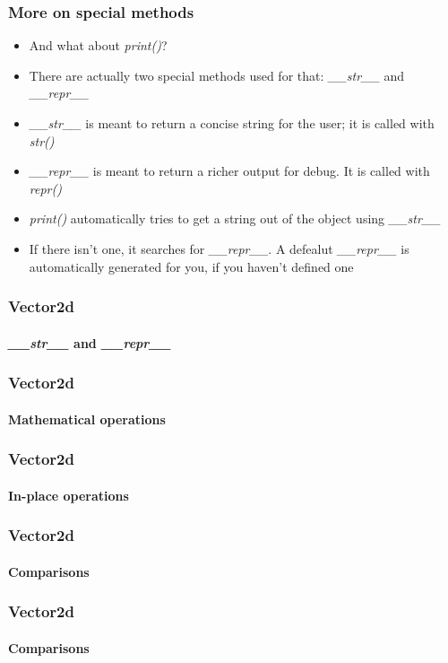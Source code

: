 \documentclass[9pt]{beamer}
\begin{document}
\begin{frame}
  \frametitle{More on special methods}
  
  \begin{itemize}
    \item And what about \emph{print()}?
    \item There are actually two special methods used for that: \emph{\_\_str\_\_} and \emph{\_\_repr\_\_}
    \medskip
    \item \emph{\_\_str\_\_} is meant to return a concise string for the user; it is called with \emph{str()}
    \medskip
    \item \emph{\_\_repr\_\_} is meant to return a richer output for debug. It is called with \emph{repr()}
    \medskip
    \item \emph{print()} automatically tries to get a string out of the object using \emph{\_\_str\_\_}
    \medskip
    \item If there isn't one, it searches for \emph{\_\_repr\_\_}. A defealut \emph{\_\_repr\_\_}
          is automatically generated for you, if you haven't defined one
  \end{itemize}
  
\end{frame}


\begin{frame}
  \frametitle{Vector2d}
  \framesubtitle{\emph{\_\_str\_\_} and \emph{\_\_repr\_\_}}
  
\end{frame}


\begin{frame}
  \frametitle{Vector2d}
  \framesubtitle{Mathematical operations}
  
\end{frame}


\begin{frame}
  \frametitle{Vector2d}
  \framesubtitle{In-place operations}
  
\end{frame}


\begin{frame}
  \frametitle{Vector2d}
  \framesubtitle{Comparisons}
  
\end{frame}


\begin{frame}
  \frametitle{Vector2d}
  \framesubtitle{Comparisons}
  
\end{frame}
\end{document}
